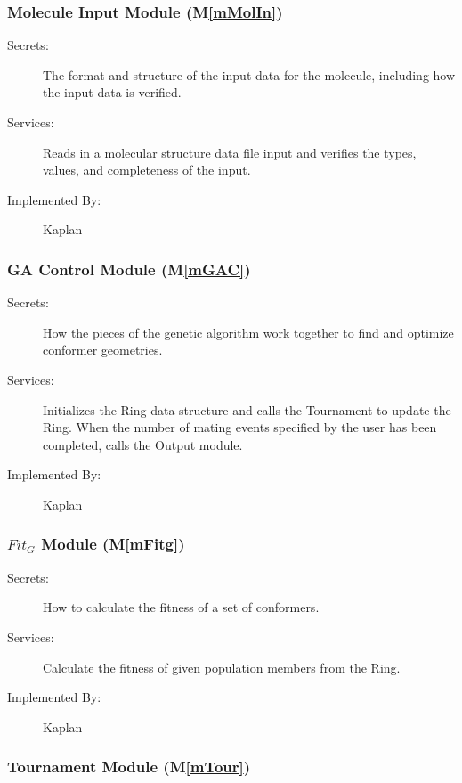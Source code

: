 \documentclass[12pt, titlepage]{article}
\newcommand{\mref}[1]{M\ref{#1}}
\newcommand{\progname}{Kaplan} %
\begin{document}
\subsubsection{Molecule Input Module (\mref{mMolIn})}
\begin{description}
	\item[Secrets:] The format and structure of the input data for the 
	molecule, including how the input data is verified.
	\item[Services:] Reads in a molecular structure data file input and 
	verifies the types, values, and completeness of the input.
	\item[Implemented By:] \progname{}
\end{description}

\subsubsection{GA Control Module (\mref{mGAC})}

\begin{description}
	\item[Secrets:] How the pieces of the genetic algorithm work together to 
	find and optimize conformer geometries.
	\item[Services:] Initializes the Ring data structure and calls the 
	Tournament to update the Ring. When the number of mating events specified 
	by the user has been completed, calls the Output module. 
	\item[Implemented By:] \progname{}
\end{description}

\subsubsection{$Fit_G$ Module (\mref{mFitg})}

\begin{description}
	\item[Secrets:] How to calculate the fitness of a set of conformers.
	\item[Services:] Calculate the fitness of given population members from the 
	Ring.
	\item[Implemented By:] \progname{}
\end{description}

\subsubsection{Tournament Module (\mref{mTour})}
\end{document}
